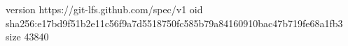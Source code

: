 version https://git-lfs.github.com/spec/v1
oid sha256:e17bd9f51b2e11c56f9a7d5518750fc585b79a84160910bac47b719fe68a1fb3
size 43840
